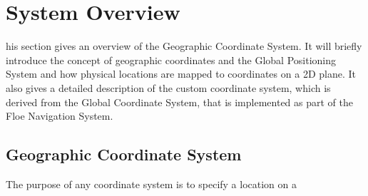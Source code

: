 %
%
\let\textcircled=\pgftextcircled
\chapter{System Overview}
\label{chap:systemoverview}
\noindent
{}his section gives an overview of the Geographic Coordinate System. It will briefly introduce the concept of geographic coordinates and the Global Positioning System and how physical locations are mapped to coordinates on a 2D plane. It also gives a detailed description of the custom coordinate system, which is derived from the Global Coordinate System, that is implemented as part of the Floe Navigation System.
\section{Geographic Coordinate System}
The purpose of any coordinate system is to specify a location on a 
